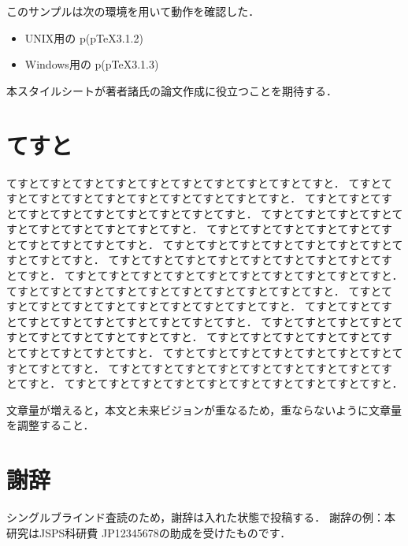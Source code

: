 \documentclass[twoside]{wiss}
\begin{document}
このサンプルは次の環境を用いて動作を確認した．
\begin{itemize}
	\item UNIX用の p\LaTeXe (p\TeX3.1.2)
	\item Windows用の p\LaTeXe (p\TeX3.1.3)
\end{itemize}
本スタイルシートが著者諸氏の論文作成に役立つことを期待する．


\section{てすと}

てすとてすとてすとてすとてすとてすとてすとてすとてすとてすと．
てすとてすとてすとてすとてすとてすとてすとてすとてすとてすと．
てすとてすとてすとてすとてすとてすとてすとてすとてすとてすと．
てすとてすとてすとてすとてすとてすとてすとてすとてすとてすと．
てすとてすとてすとてすとてすとてすとてすとてすとてすとてすと．
てすとてすとてすとてすとてすとてすとてすとてすとてすとてすと．
てすとてすとてすとてすとてすとてすとてすとてすとてすとてすと．
てすとてすとてすとてすとてすとてすとてすとてすとてすとてすと．
てすとてすとてすとてすとてすとてすとてすとてすとてすとてすと．
てすとてすとてすとてすとてすとてすとてすとてすとてすとてすと．
てすとてすとてすとてすとてすとてすとてすとてすとてすとてすと．
てすとてすとてすとてすとてすとてすとてすとてすとてすとてすと．
てすとてすとてすとてすとてすとてすとてすとてすとてすとてすと．
てすとてすとてすとてすとてすとてすとてすとてすとてすとてすと．
てすとてすとてすとてすとてすとてすとてすとてすとてすとてすと．
てすとてすとてすとてすとてすとてすとてすとてすとてすとてすと．


文章量が増えると，本文と未来ビジョンが重なるため，重ならないように文章量を調整すること．


\section*{謝辞}
シングルブラインド査読のため，謝辞は入れた状態で投稿する．
謝辞の例：本研究はJSPS科研費 JP12345678の助成を受けたものです．




\end{document}

